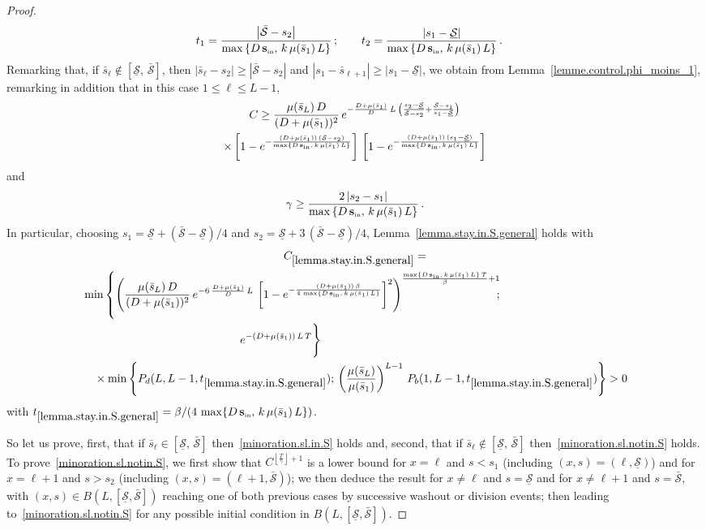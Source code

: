 \documentclass[AHL,Unicode,longabstracts,published]{cedram}
\newcommand{\Sin}{{\mathbf s}_{\textrm{\tiny\rm in}}}
\newcommand{\Smin}{\underline{\mathcal{S}}}
\newcommand{\Smax}{\bar{\mathcal{S}}}
\newcommand{\barmu}{\mu(\bar s_1)}
\newcommand{\1}{\mathbf{1}}
\begin{document}
\begin{proof}
\begin{align*}
t_1 &= \frac{\left|\Smax-s_2\right|}{\max
\left\{D\,\Sin,\, k\,\barmu\,L\right\}}\,;\qquad t_2 = \frac{\left|s_1-\Smin\right|}{\max\left\{D\,\Sin,\, k\,\barmu\,L\right\}}\,.
\end{align*}
Remarking that, if $\bar s_\ell \notin [\Smin, \, \Smax]$, then $|\bar s_\ell-s_2|\geq |\Smax-s_2|$ and $|s_1- \bar s_{\ell+1}|\geq |s_1-\Smin|$, we obtain from Lemma~\ref{lemme.control.phi_moins_1}, remarking in addition that in this case $1\leq \ell \leq L-1$,
\begin{multline*}
C \geq \frac{\mu(\bar s_L)\,D}{(D+\barmu)^2}\, e^{-\frac{D+\barmu}{D}\,L\,\left(\frac{s_2-\Smin}{\Smax-s_2} +\frac{\Smax-s_1}{s_1-\Smin}\right)} \\
\times\left[1-e^{-\frac{(D+\barmu)\,(\Smax-s_2)}{\max\left\{D\,\Sin,\,k\,\barmu\,L\right\}}}\right]\,
\left[1-e^{-\frac{(D+\barmu)\,(s_1-\Smin)}{\max\left\{D\,\Sin,\,k\,\barmu\,L\right\}}}\right]
\end{multline*}
and
\[
\gamma \geq \frac{2\,|s_2-s_1|}{\max\left\{D\,\Sin, \, k\,\barmu\,L\right\}}\,.
\]
In particular, choosing $s_1 = \Smin+(\Smax-\Smin)/4$ and $s_2 = \Smin+3\,(\Smax-\Smin)/4$, Lem\-ma~\ref{lemma.stay.in.S.general} holds with
\begin{multline*}
C_{\ref{lemma.stay.in.S.general}}= \\
\begin{aligned}
&\min\left\{
\left(\frac{\mu(\bar s_L)\,D}{(D+\barmu)^2}\, e^{-6\,\frac{D+\barmu}{D}\,L} \,
\left[1-e^{-\frac{(D+\barmu)\,\beta}{4\,\max\left\{D\,\Sin,\,k\,\barmu\,L\right\}}}\right]^2\right)^{\frac{\max\left\{D\,\Sin, \, k\,\barmu\,L\right\}\,T}{\beta}+1}\!\!\!;\right.
\\
&\mkern250mu e^{-(D+\barmu)\,L\,T} \Bigg\}
\\
&\quad
\times \min\left\{ P_d(L,L-1, t_{\ref{lemma.stay.in.S.general}});\,
\left(\frac{\mu(\bar s_L)}{\barmu}\right)^{L-1}\, P_b(1,L-1, t_{\ref{lemma.stay.in.S.general}})
\right\}>0
\end{aligned}
\end{multline*}
with $t_{\ref{lemma.stay.in.S.general}} = \beta/(4\,\max\{D\,\Sin,\, k\,\barmu\,L\})$.


So let us prove, first, that if $\bar s_\ell \in [\Smin, \, \Smax]$ then~\eqref{minoration.sl.in.S} holds and, second, that if $\bar s_\ell \notin [\Smin, \, \Smax]$ then~\eqref{minoration.sl.notin.S} holds. To prove~\eqref{minoration.sl.notin.S}, we first show that $C^{\left\lfloor\frac{T}{\gamma}\right\rfloor+1}$ is a lower bound for $x=\ell$ and $s<s_1$ (including $(x,s)=(\ell,\Smin)$) and for $x=\ell+1$ and $s>s_2$ (including $(x,s)=(\ell+1,\Smax)$); we then deduce the result for $x \neq \ell$ and $s=\Smin$ and for $x\neq \ell+1$ and $s=\Smax$, with $(x,s)\in B(L,[\Smin,\Smax])$ reaching one of both previous cases by successive washout or division events; then leading to~\eqref{minoration.sl.notin.S} for any possible initial condition in $B(L,[\Smin,\Smax])$.


\end{proof}
\end{document}
